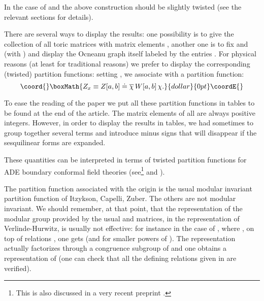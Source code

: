 \documentclass[a4paper,11pt]{article}
\providecommand{\ZZ}{\mathbb{Z}}
\begin{document}
In the case of \coordHE{} and \coordHE{} the above construction should be
slightly twisted (see the relevant sections for details).

\smallskip

There are several ways to display the results: one possibility is to give
the collection of
all toric matrices
\coordHE{} with matrix elements \coordHE{}, another one is to fix
\coordHE{} and \coordHE{} (with
\coordHE{})
and display the Ocneanu graph itself labeled by the entries
\coordHE{}. For
physical reasons (at
least for traditional reasons)  we prefer to display the
corresponding (twisted)
partition functions: setting \coordHE{}, we
associate with \coordHE{}
a partition function:
       $$\coord{}\boxMath{Z_x \equiv Z[a,b] \doteq \overline{\chi} \, W[a,b] \, \chi .}{dollar}{0pt}\coordE{}$$

       To ease the reading of the paper we  put all these partition functions in
       tables to be found at the end of the article. The matrix elements
       of all \coordHE{} are always positive integers. However, in order
       to display the results in tables, we had sometimes to group together
       several terms and introduce minus signs that will disappear if
       the sesquilinear forms are expanded.

These quantities can be interpreted in terms of twisted partition functions for
ADE boundary conformal field theories (see\footnote{This is also
discussed in a very recent preprint \cite{Otto}.}\cite{PetZub:Oc} and \cite{PetkovaZuber:bulk}).


The partition function \coordHE{} associated with the origin \coordHE{} is the usual
modular invariant partition function of Itzykson, Capelli, Zuber. The
others are not modular invariant. We should remember, at that point, that
the representation of the modular group provided by the usual \coordHE{} and \coordHE{}
matrices, in the representation of Verlinde-Hurwitz, is usually not effective:
for instance in the case of \coordHE{}, where \coordHE{}, on top of
relations  \coordHE{}, one
gets \coordHE{} (and \coordHE{} for smaller powers of \coordHE{}). The
representation actually factorizes through a congruence subgroup of
\myHighlight{$SL(2,\ZZ)$}\coordHE{} and one obtains a representation of  \myHighlight{$SL(2,\ZZ/48 \ZZ)$}\coordHE{}
(one can check that all the defining relations given in
\cite{CosteGannon:modular} are verified).
\end{document}
